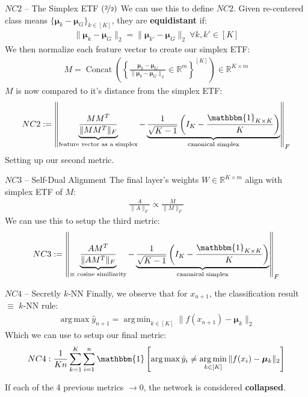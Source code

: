 \documentclass{beamer}
\DeclareMathOperator{\Concat}{Concat}
\DeclareMathOperator*{\argmax}{arg\,max}
\DeclareMathOperator*{\argmin}{arg\,min}
\begin{document}
\begin{frame}{$NC2$ -- The Simplex ETF $(\nicefrac{2}{2})$}
	We can use this to define $NC2$. Given re-centered class means $\{\bm{\mu}_k - \bm{\mu}_G\}_{k \in [K]}$, they are \textbf{equidistant} if:
	\begin{gather}
		\| \bm{\mu}_k - \bm{\mu}_G \|_2 = \| \bm{\mu}_{k'} - \bm{\mu}_G \|_2\ \forall k, k' \in [K]
	\end{gather} \pause
	We then normalize each feature vector to create our simplex ETF:
	\begin{gather}
		M = \Concat\left(\left\{\frac{\bm{\mu}_k - \bm{\mu}_G}{\| \bm{\mu}_k - \bm{\mu}_G \|_2} \in \mathbb{R}^m \right\}^{[K]}\right) \in \mathbb{R}^{K \times m}
	\end{gather} \pause
	$M$ is now compared to it's distance from the simplex ETF:
	\begin{gather}
		NC2 := \left\| \underbrace{\frac{MM^T}{\| MM^T \|_F}}_{\text{feature vector as a simplex}} - \underbrace{\frac{1}{\sqrt{K - 1}} \left(I_K - \frac{\mathbbm{1}_{K \times K}}{K} \right)}_{\text{canonical simplex}} \right\|_F
	\end{gather}
	Setting up our second metric.
\end{frame}

\begin{frame}{$NC3$ -- Self-Dual Alignment}
	The final layer's weights $W \in \mathbb{R}^{K \times m}$ align with simplex ETF of $M$:
	\begin{gather}
		\frac{A}{\|A\|_F} \propto \frac{M}{\| M \|_F}
	\end{gather} \pause
	We can use this to setup the third metric:
	\begin{gather}
		NC3 := \left\| \underbrace{\frac{AM^T}{\| AM^T \|_F}}_{\equiv \text{ cosine similiarity}} - \underbrace{\frac{1}{\sqrt{K - 1}} \left(I_K - \frac{\mathbbm{1}_{K \times K}}{K} \right)}_{\text{canonical simplex}} \right\|_F
	\end{gather}
\end{frame}

\begin{frame}{$NC4$ -- Secretly $k$-NN}
	Finally, we observe that for $x_{n+1}$, the classification result $\equiv$ $k$-NN rule:
	\begin{gather}
		\argmax \hat{y}_{n+1} = \argmin_{k \in [K]} \| f(x_{n+1}) - \bm{\mu}_k \|_2
	\end{gather} \pause
	Which we can use to setup our final metric:
	\begin{gather}
		NC4: \frac{1}{Kn} \sum^K_{k=1} \sum^n_{i=1} \mathbbm{1}\left[\argmax \hat{y}_{i} \neq \argmin_{k \in [K]} \| f(x_{i}) - \bm{\mu}_k \|_2\right]
	\end{gather} \pause

	If each of the 4 previous metrics $\rightarrow 0$, the network is considered \textbf{collapsed}.
\end{frame}
\end{document}
